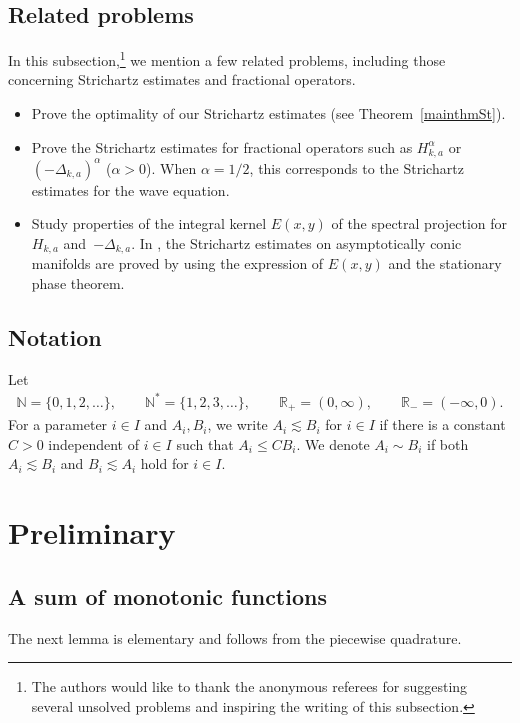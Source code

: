 \documentclass[pdftex]{sigma}
\numberwithin{equation}{section}
\def\R{\mathbb{R}}%
\def\a{\alpha}
\begin{document}
\subsection{Related problems}

In this subsection,\footnote{The authors would like to thank the anonymous referees for suggesting several unsolved problems and inspiring the writing of this subsection.} we mention a few related problems, including those concerning Strichartz estimates and fractional operators.
\begin{itemize}\itemsep=0pt
\item Prove the optimality of our Strichartz estimates (see Theorem~\ref{mainthmSt}).
\item Prove the Strichartz estimates for fractional operators such as $H_{k,a}^{\a}$ or $(-\Delta_{k,a})^{\a}$ ($\a>0$). When $\a=1/2$, this corresponds to the Strichartz estimates for the wave equation.
\item Study properties of the integral kernel $E(x,y)$ of the spectral projection for $H_{k,a}$ and~$-\Delta_{k,a}$. In \cite{HZ}, the Strichartz estimates on asymptotically conic manifolds are proved by using the expression of $E(x,y)$ and the stationary phase theorem.
\end{itemize}

\subsection{Notation}
Let
\begin{align*}
\mathbb{N}=\{0,1,2,\hdots\},\qquad \mathbb{N}^*=\{1,2,3,\hdots\}, \qquad \R_{+}=(0,\infty),\qquad \R_-=(-\infty,0).
\end{align*}
For a parameter $i\in I$ and $A_i,B_i$, we write $A_i\lesssim B_i$ for $i\in I$ if there is a constant $C>0$ independent of $i\in I$ such that $A_i\leq CB_i$. We denote $A_i\sim B_i$ if both $A_i\lesssim B_i$ and $B_i\lesssim A_i$ hold for $i\in I$.

\section{Preliminary}

\subsection{A sum of monotonic functions}

The next lemma is elementary and follows from the piecewise quadrature.
\end{document}
